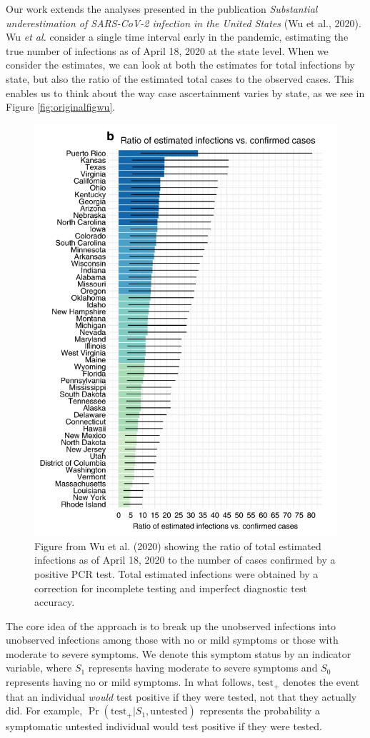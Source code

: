 \documentclass[12pt,twoside]{smiththesis}
\begin{document}
Our work extends the analyses presented in the publication \emph{Substantial underestimation of SARS-CoV-2 infection in the United States} (Wu et al., 2020). Wu \emph{et al.} consider a single time interval early in the pandemic, estimating the true number of infections as of April 18, 2020 at the state level. When we consider the estimates, we can look at both the estimates for total infections by state, but also the ratio of the estimated total cases to the observed cases. This enables us to think about the way case ascertainment varies by state, as we see in Figure
\ref{fig:originalfigwu}.
\begin{figure}
\includegraphics[width=0.5\linewidth]{./figure/figure_original_case_ratio} \caption{\label{fig:originalfigwu}Figure from Wu et al. (2020) showing the ratio of total estimated infections as of April 18, 2020 to the number of cases confirmed by a positive PCR test. Total estimated infections were obtained by a correction for incomplete testing and imperfect diagnostic test accuracy.}\label{fig:unnamed-chunk-7}
\end{figure}
The core idea of the approach is to break up the unobserved infections into unobserved infections among those with no or mild symptoms or those with moderate to severe symptoms. We denote this symptom status by an indicator variable, where \(S_1\) represents having moderate to severe symptoms and \(S_0\) represents having no or mild symptoms. In what follows, \(\text{test}_+\) denotes the event that an individual \emph{would} test positive if they were tested, not that they actually did. For example, \(\Pr(\text{test}_+|S_1,\text{untested})\) represents the probability a symptomatic untested individual would test positive if they were tested.
\end{document}
